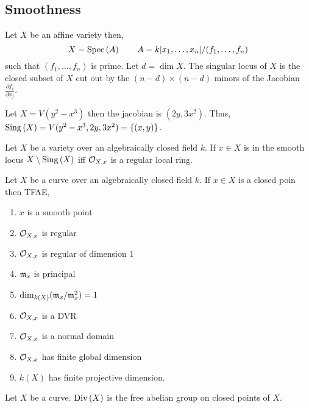 \documentclass[12pt]{article}
\begin{document}
\subsection{Smoothness}

\begin{definition}
Let $X$ be an affine variety then,
\[ X = \mathrm{Spec}\left( A \right) \quad \quad A = k[x_1, \dots , x_n] / (f_1, \dots , f_n) \]
such that $(f_1, \dots , f_n)$ is prime. Let $d = \dim{X}$. The singular locus of $X$ is the closed subset of $X$ cut out by the $(n - d) \times (n - d)$ minors of the Jacobian $\frac{\partial f_i}{\partial x_j}$.   
\end{definition}


\begin{example}
Let $X = V(y^2 - x^3)$ then the jacobian is $(2 y, 3x^2)$. Thus, $\mathrm{Sing}\left( X \right) = V(y^2 - x^3, 2y, 3 x^2) = \{ (x,y) \} $.
\end{example}

\begin{proposition}
Let $X$ be a variety over an algebraically closed field $k$. If $x \in X$ is in the smooth locus $X \setminus \mathrm{Sing}\left( X \right)$ iff $\mathcal{O}_{X, x}$ is a regular local ring. 
\end{proposition}

\begin{theorem}
Let $X$ be a curve over an algebraically closed field $k$. If $x \in X$ is a closed poin then TFAE,
\begin{enumerate}
\item $x$ is a smooth point
\item $\mathcal{O}_{X, x}$ is regular
\item $\mathcal{O}_{X, x}$ is regular of dimension $1$
\item $\mathfrak{m}_x$ is principal
\item $\dim_{k(X)} (\mathfrak{m}_x / \mathfrak{m}_x^2) = 1$
\item $\mathcal{O}_{X, x}$ is a DVR
\item $\mathcal{O}_{X, x}$ is a normal domain
\item $\mathcal{O}_{X, x}$ has finite global dimension
\item $k(X)$ has finite projective dimension. 
\end{enumerate}
\end{theorem}



\begin{definition}
Let $X$ be a curve. $\mathrm{Div}\left( X \right)$ is the free abelian group on closed points of $X$.
\end{definition}
\end{document}
